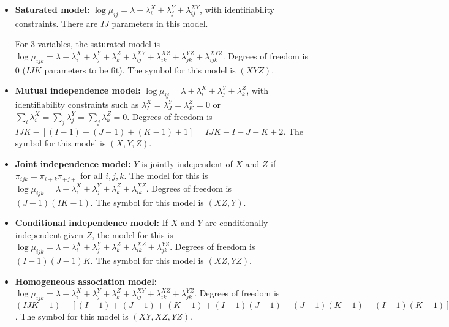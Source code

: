 \documentclass[twoside]{article}
\newcommand\lmb{\lambda}
\begin{document}
\begin{itemize}
\item \textbf{Saturated model:} $\log \mu_{ij} = \lmb + \lmb_i^X + \lmb_j^Y + \lmb_{ij}^{XY}$, with identifiability constraints. There are $IJ$ parameters in this model.

For 3 variables, the saturated model is $\log \mu_{ijk} = \lmb + \lmb_i^X + \lmb_j^Y + \lmb_k^Z + \lmb_{ij}^{XY} + \lmb_{ik}^{XZ} + \lmb_{jk}^{YZ} + \lmb_{ijk}^{XYZ}$. Degrees of freedom is $0$ ($IJK$ parameters to be fit). The symbol for this model is $(XYZ)$.

\item \textbf{Mutual independence model:} $\log \mu_{ij} = \lmb + \lmb_i^X + \lmb_j^Y +\lmb_k^Z$, with identifiability constraints such as $\lmb_I^X = \lmb_J^Y = \lmb_K^Z = 0$ or $\sum_i \lmb_i^X = \sum_j \lmb_j^Y = \sum_j \lmb_k^Z = 0$. Degrees of freedom is $IJK - [(I-1) + (J-1) + (K-1) + 1] = IJK - I - J - K + 2$. The symbol for this model is $(X,Y,Z)$.

\item \textbf{Joint independence model:} $Y$ is jointly independent of $X$ and $Z$ if $\pi_{ijk} = \pi_{i+k}\pi_{+j+}$ for all $i,j,k$. The model for this is $\log \mu_{ijk} = \lmb + \lmb_i^X + \lmb_j^Y + \lmb_k^Z + \lmb_{ik}^{XZ}$. Degrees of freedom is $(J-1)(IK - 1)$. The symbol for this model is $(XZ,Y)$.

\item \textbf{Conditional independence model:} If $X$ and $Y$ are conditionally independent given $Z$, the model for this is $\log \mu_{ijk} = \lmb + \lmb_i^X + \lmb_j^Y + \lmb_k^Z + \lmb_{ik}^{XZ} + \lmb_{jk}^{YZ}$. Degrees of freedom is $(I-1)(J-1)K$. The symbol for this model is $(XZ, YZ)$.

\item \textbf{Homogeneous association model:} $\log \mu_{ijk} = \lmb + \lmb_i^X + \lmb_j^Y + \lmb_k^Z + \lmb_{ij}^{XY} + \lmb_{ik}^{XZ} + \lmb_{jk}^{YZ}$. Degrees of freedom is $(IJK-1) - [(I-1) + (J-1) + (K-1) + (I-1)(J-1) + (J-1)(K-1) + (I-1)(K-1)] = (I-1)(J-1)(K-1)$. The symbol for this model is $(XY, XZ, YZ)$.
\end{itemize}
\end{document}
